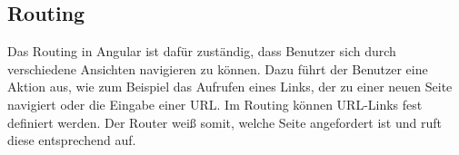 \subsection{Routing}
Das Routing in Angular ist dafür zuständig, dass Benutzer sich durch verschiedene Ansichten navigieren zu können. Dazu führt der Benutzer eine Aktion aus, wie zum Beispiel das Aufrufen eines Links, der zu einer neuen Seite navigiert oder die Eingabe einer URL. Im Routing können URL-Links fest definiert werden. Der Router weiß somit, welche Seite angefordert ist und ruft diese entsprechend auf.



